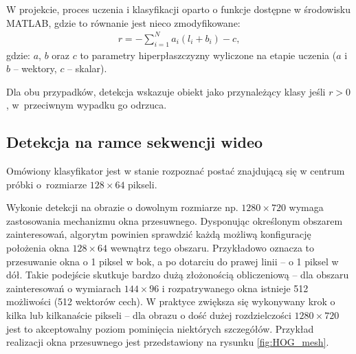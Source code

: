 W projekcie, proces uczenia i klasyfikacji oparto o funkcje dostępne w środowisku \mbox{MATLAB}, gdzie to równanie jest nieco zmodyfikowane:
\begin{equation}
\label{eq:HOG_classificationMATLAB}
\left.\begin{aligned} 
r=-\sum_{i=1}^{N}a_i(l_i+b_i)-c,
\end{aligned}\right.
\end{equation}
gdzie: $a$, $b$ oraz $c$ to parametry hiperpłaszczyzny wyliczone na etapie uczenia ($a$ i $b$ -- wektory, $c$ -- skalar).

Dla obu przypadków, detekcja wskazuje obiekt jako przynależący klasy jeśli $r>0$, w~przeciwnym wypadku go odrzuca.


\subsection{Detekcja na ramce sekwencji wideo}

Omówiony klasyfikator jest w stanie rozpoznać postać znajdującą się w centrum próbki o~rozmiarze $128 \times 64$ pikseli. 

Wykonie detekcji na obrazie o dowolnym rozmiarze np. $1280 \times 720$ wymaga zastosowania mechanizmu okna przesuwnego. 
Dysponując określonym obszarem zainteresowań, algorytm powinien sprawdzić każdą możliwą konfigurację położenia okna $128\times 64$ wewnątrz tego obszaru. 
Przykładowo oznacza to przesuwanie okna o 1 piksel w bok, a po dotarciu do prawej linii -- o 1 piksel w dół.
Takie podejście skutkuje bardzo dużą złożonością obliczeniową -- dla obszaru zainteresowań o wymiarach $144\times 96$ i rozpatrywanego okna istnieje 512 możliwości (512 wektorów cech). 
W praktyce zwiększa się wykonywany krok o kilka lub kilkanaście pikseli -- dla obrazu o dość dużej rozdzielczości $1280 \times 720$ jest to akceptowalny poziom pominięcia niektórych szczegółów.
Przykład realizacji okna przesuwnego jest przedstawiony na rysunku \ref{fig:HOG_mesh}.


